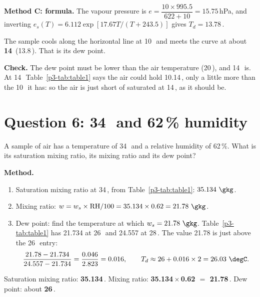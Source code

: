 \textbf{Method C: formula.} The vapour pressure is $e=\dfrac{10\times995.5}{622+10}=15.75$\,hPa, and inverting $e_s(T)=6.112\exp[17.67T/(T+243.5)]$ \citep{bolton1980} gives $T_d=13.78$\,\degC.

\begin{answerbox}
The sample cools along the horizontal line at 10\,\gkg\ and meets the curve at about \textbf{14\,\degC} (13.8\,\degC). That is its dew point.
\end{answerbox}

\textbf{Check.} The dew point must be lower than the air temperature (20\,\degC), and 14\,\degC\ is. At 14\,\degC\ Table~\ref{p3-tab:table1} says the air could hold 10.14\,\gkg, only a little more than the 10\,\gkg\ it has: so the air is just short of saturated at 14\,\degC, as it should be.

\section{Question 6: 34\,\degC\ and 62\,\% humidity}\label{p3-sec:q6}

\begin{questionbox}
A sample of air has a temperature of 34\,\degC\ and a relative humidity of 62\,\%. What is its saturation mixing ratio, its mixing ratio and its dew point?
\end{questionbox}

\textbf{Method.}
\begin{enumerate}[label=\textbf{Step \arabic*.},leftmargin=*,itemsep=3pt]
\item Saturation mixing ratio at 34\,\degC, from Table~\ref{p3-tab:table1}: $35.134\ \gkg$.
\item Mixing ratio: $w=w_s\times\mathrm{RH}/100=35.134\times0.62=21.78\ \gkg$.
\item Dew point: find the temperature at which $w_s=21.78\ \gkg$. Table~\ref{p3-tab:table1} has 21.734 at 26\,\degC\ and 24.557 at 28\,\degC. The value 21.78 is just above the 26\,\degC\ entry:
\[
\frac{21.78-21.734}{24.557-21.734}=\frac{0.046}{2.823}=0.016,\qquad T_d\approx26+0.016\times2=26.03\ \degC .
\]
\end{enumerate}

\begin{answerbox}
Saturation mixing ratio: \textbf{35.134\,\gkg}. Mixing ratio: \textbf{35.134\,$\times$\,0.62 $=$ 21.78\,\gkg}. Dew point: about \textbf{26\,\degC}.
\end{answerbox}

